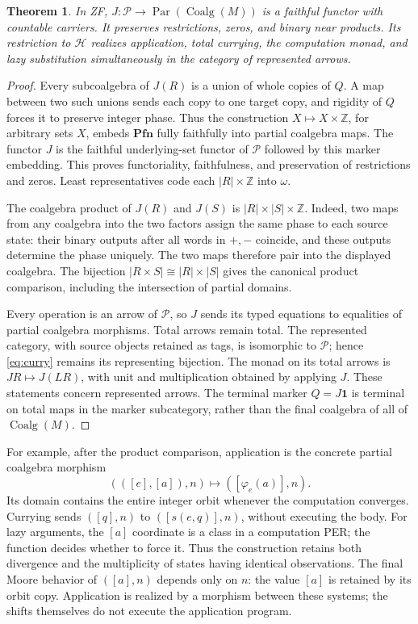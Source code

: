 \documentclass[11pt]{article}
\newtheorem{theorem}{Theorem}[section]
\theoremstyle{definition}
\newcommand{\N}{\omega}
\newcommand{\Pcat}{\mathcal P}
\newcommand{\Hcat}{\mathcal H}
\newcommand{\Coalg}{\operatorname{Coalg}}
\newcommand{\Par}{\operatorname{Par}}
\begin{document}
\begin{theorem}\label{thm:coalgebra}
In ZF, $J:\Pcat\to\Par(\Coalg(M))$ is a faithful functor
with countable carriers. It preserves restrictions, zeros, and binary
near products. Its restriction to $\Hcat$ realizes application,
total currying, the computation monad, and lazy substitution
simultaneously in the category of represented arrows.
\end{theorem}
\begin{proof}
Every subcoalgebra of $J(R)$ is a union of whole copies of $Q$.
A map between two such unions sends each copy to one target copy,
and rigidity of $Q$ forces it to preserve integer phase. Thus the
construction $X\mapsto X\times\mathbb Z$, for arbitrary sets $X$,
embeds $\mathbf{Pfn}$ fully faithfully into partial coalgebra maps.
The functor $J$ is the faithful underlying-set
functor of $\Pcat$ followed by this marker embedding. This proves
functoriality, faithfulness, and preservation of restrictions and zeros.
Least representatives code each $|R|\times\mathbb Z$ into $\N$.

The coalgebra product of $J(R)$ and $J(S)$ is
$|R|\times|S|\times\mathbb Z$. Indeed, two maps from any
coalgebra into the two factors assign the same phase to each source
state: their binary outputs after all words in $+,-$ coincide, and
these outputs determine the phase uniquely. The two maps therefore
pair into the displayed coalgebra. The bijection
$|R\times S|\cong|R|\times|S|$ gives the canonical product
comparison, including the intersection of partial domains.

Every operation is an arrow of $\Pcat$, so $J$ sends its typed
equations to equalities of partial coalgebra morphisms. Total arrows
remain total. The represented category, with source objects retained
as tags, is isomorphic to $\Pcat$; hence \eqref{eq:curry} remains
its representing bijection. The monad on its total arrows is
$JR\mapsto J(LR)$, with unit and multiplication obtained by
applying $J$. These statements concern represented arrows. The
terminal marker $Q=J\mathbf1$ is terminal on total maps in the
marker subcategory, rather than the final coalgebra of all of
$\Coalg(M)$.
\end{proof}

For example, after the product comparison, application is the concrete
partial coalgebra morphism
\[
 (([e],[a]),n)\longmapsto([\varphi_e(a)],n).
\]
Its domain contains the entire integer orbit whenever the computation
converges. Currying sends $([q],n)$ to $([s(e,q)],n)$, without
executing the body. For lazy arguments, the $[a]$ coordinate is a
class in a computation PER; the function decides whether to force it.
Thus the construction retains both divergence and the multiplicity
of states having identical observations. The final Moore behavior of
$([a],n)$ depends only on $n$: the value $[a]$ is retained by its
orbit copy. Application is realized by a morphism between these
systems; the shifts themselves do not execute the application program.
\end{document}
